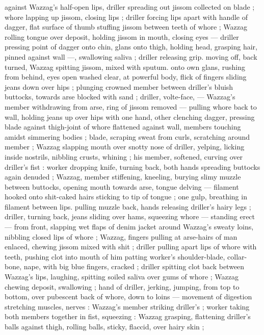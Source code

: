against Wazzag's half-open lips, driller spreading out jissom 
collected on blade ; whore lapping up jissom, closing lips ; driller 
forcing lips apart with handle of dagger, flat surface of thumb 
stuffing jissom between teeth of whore ; Wazzag rolling tongue over 
deposit, holding jissom in mouth, closing eyes --- driller pressing 
point of dagger onto chin, glans onto thigh, holding head, grasping 
hair, pinned against wall ---, swallowing saliva ; driller releasing grip. 
moving off, back turned, Wazzag spitting jissom, mixed with sputum. 
onto own glans, rushing from behind, eyes open washed clear, at 
powerful body, flick of fingers sliding jeans down over hips ; plunging 
crowned member between driller's bluish buttocks, towards arse 
blocked with sand ; driller, volte-face, --- Wazzag's member 
withdrawing from arse, ring of jissom removed --- pulling whore back 
to wall, holding jeans up over hips with one hand, other clenching 
dagger, pressing blade against thigh-joint of whore flattened against 
wall, members touching amidst simmering bodies ; blade, scraping 
sweat from curls, scratching around member ; Wazzag slapping 
mouth over snotty nose of driller, yelping, licking inside nostrils, 
nibbling crusts, whining ; his member, softened, curving over driller's 
fist : worker dropping knife, turning back, both hands spreading 
buttocks again denuded ; Wazzag, member stiffening, kneeling, 
burying slimy muzzle between buttocks, opening mouth towards 
arse, tongue delving --- filament hooked onto shit-caked hairs 
sticking to tip of tongue ; one gulp, breathing in filament between 
lips. pulling muzzle back, hands releasing driller's hairy legs ; driller, 
turning back, jeans sliding over hams, squeezing whore --- standing 
erect --- from front, slapping wet flaps of denim jacket around 
Wazzag's sweaty loins, nibbling closed lips of whore ; Wazzag, 
fingers pulling at arse-hairs of man enlaced, chewing jissom mixed 
with shit ; driller pulling apart lips of whore with teeth, pushing clot 
into mouth of him patting worker's shoulder-blade, collar-bone, 
nape, with big blue fingers, cracked ; driller spitting clot back 
between Wazzag's lips, laughing, spitting soiled saliva over gums of 
whore ; Wazzag chewing deposit, swallowing ; hand of driller, jerking, 
jumping, from top to bottom, over pubescent back of whore, down to 
loins --- movement of digestion stretching muscles, nerves : 
Wazzag's member striking driller's ; worker taking both members 
together in fist, squeezing : Wazzag grasping, flattening driller's 
balls against thigh, rolling balls, sticky, flaccid, over hairy skin ; 
